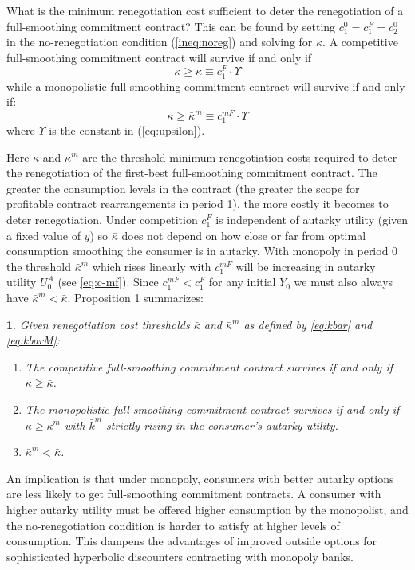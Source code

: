 \documentclass[11pt,english]{article}
\theoremstyle{plain}
\newtheorem{prop}{\protect\propositionname}
\theoremstyle{definition}
\providecommand{\propositionname}{Proposition}
\begin{document}
What is the minimum renegotiation cost sufficient to deter the renegotiation
of a full-smoothing commitment contract? This can be found by setting $c_{1}^{0}=c_{1}^{F}=c_{2}^{0}$
in the no-renegotiation condition (\ref{ineq:noreg}) and solving
for $\kappa$. A competitive full-smoothing commitment contract will
survive if and only if 
\begin{equation}
\kappa\geq\bar{\kappa}\equiv c_{1}^{F}\cdot\Upsilon\label{eq:kbar}
\end{equation}
while a monopolistic full-smoothing commitment contract will survive
if and only if: 
\begin{equation}
\kappa\geq\bar{\kappa}^{m}\equiv c_{1}^{mF}\cdot\Upsilon\label{eq:kbarM}
\end{equation}
where $\Upsilon$ is the constant in (\ref{eq:upsilon}).

Here $\bar{\kappa}$ and $\bar{\kappa}^{m}$ are the threshold minimum
renegotiation costs required to deter the renegotiation of the first-best
full-smoothing commitment contract. The greater the consumption
levels in the contract (the greater the scope for profitable
contract rearrangements in period 1), the more costly it becomes to
deter renegotiation.
Under competition $c_{1}^{F}$ is independent of autarky utility (given
a fixed value of $y$) so $\bar{\kappa}$ does not depend on how close
or far from optimal consumption smoothing the consumer is in autarky.
With monopoly in period 0 the threshold $\bar{\kappa}^{m}$ which
rises linearly with $c_{1}^{mF}$ will be increasing in autarky utility
$U_{0}^{A}$ (see \ref{eq:c-mf}). Since $c_{1}^{mF}<c_{1}^{F}$ for
any initial $Y_{0}$ we must also always have $\bar{\kappa}^{m}<\bar{\kappa}$.
Proposition 1 summarizes: 
\begin{prop}
\label{Prop:full-commit} Given renegotiation cost thresholds  $\bar{\kappa}$
and $\bar{\kappa}^{m}$ as defined by \ref{eq:kbar} and
\ref{eq:kbarM}: 
\begin{enumerate} [label=\alph*)]
\item The competitive full-smoothing commitment contract survives
if and only if $\kappa\geq$$\bar{\kappa}$. 
\item The monopolistic full-smoothing commitment contract survives
if and only if $\kappa\geq$$\bar{\kappa}^{m}$ with $\bar{k}^{m}$
strictly rising in the consumer's autarky utility. 
\item $\bar{\kappa}^{m}<\bar{\kappa}$. 
\end{enumerate}
\end{prop}
An implication is that under
monopoly, consumers with better autarky options are less likely to
get full-smoothing commitment contracts. A
consumer with higher autarky utility must be offered higher consumption
by the monopolist, and the no-renegotiation condition is harder to
satisfy at higher levels of consumption. This  dampens the
advantages of improved outside options for sophisticated hyperbolic
discounters contracting with monopoly banks.
\end{document}
